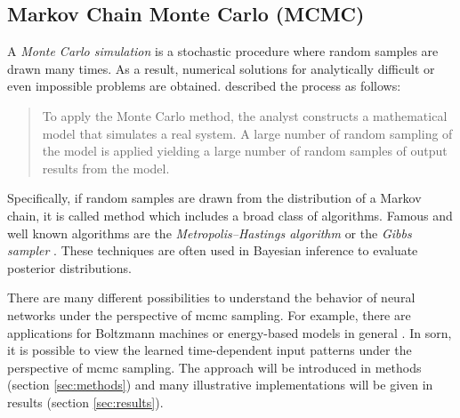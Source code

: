 \subsection{Markov Chain Monte Carlo (MCMC)}

A \emph{Monte Carlo simulation} is a stochastic procedure where random samples are drawn many times. As a result, numerical solutions for analytically difficult or even impossible problems are obtained. \textcite{thomopoulos2012essentials} described the process as follows:

\begin{quote}
To apply the Monte Carlo method, the analyst constructs a mathematical model that simulates a real system. A large number of random sampling of the model is applied yielding a large number of random samples of output results from the model.
\end{quote}

Specifically, if random samples are drawn from the distribution of a Markov chain, it is called  method which includes a broad class of algorithms. Famous and well known algorithms are the \emph{Metropolis–Hastings algorithm} \parencite{hastings1970monte} or the \emph{Gibbs sampler} \parencite{geman1984stochastic}. These techniques are often used in Bayesian inference to evaluate posterior distributions.

There are many different possibilities to understand the behavior of neural networks under the perspective of \acs{mcmc} sampling. For example, there are applications for Boltzmann machines \parencite{osogami2017boltzmann} or energy-based models in general \parencite{goodfellow2007deep}. In \acs{sorn}, it is possible to view the learned time-dependent input patterns under the perspective of \acs{mcmc} sampling. The approach will be introduced in methods (section \ref{sec:methods}) and many illustrative implementations will be given in results (section \ref{sec:results}).




